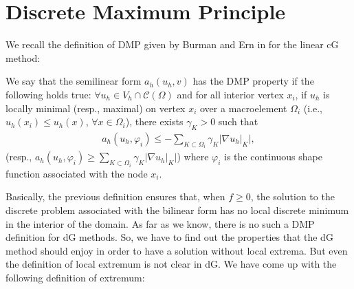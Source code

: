  
\section{Discrete Maximum Principle}\label{s-dmp}
 We recall the definition of DMP given by Burman and Ern in \cite{burman_discrete_2004,burman_nonlinear_2007} for the linear cG method:
 
 \begin{definition}[DMP cG]
 We say that the semilinear form $a_h(u_h,v)$ has the DMP property if the following holds true: $\forall u_h\in V_h\cap \mathcal{C}(\Omega)$ and for all interior vertex $x_i$, if $u_h$ is locally minimal (resp., maximal) on vertex $x_i$ over a macroelement $\Omega_i$ (i.e., $u_h(x_i)\leq u_h(x)$,  $\forall x\in\Omega_i$), there exists $\gamma_K>0$ such that
  \begin{align*}
 a_h(u_h,\varphi_i)\leq - \sum_{K\subset\Omega_i} \gamma_K |\nabla u_h|_K|,
 \end{align*} 
 (resp., $a_h(u_h,\varphi_i)\geq  \sum_{K\subset\Omega_i} \gamma_K |\nabla u_h|_K|$) where $\varphi_i$ is the continuous shape function associated with the node $x_i$.
  \end{definition}
Basically, the previous definition ensures that, when $f\geq 0$, the solution to the discrete problem associated with the bilinear form has no local discrete minimum in the interior of the domain. As far as we know, there is no such a DMP definition for dG methods. So, we have to find out the properties that the dG method should enjoy in order to have a solution without local extrema. But even the definition of local extremum is not clear in dG. { We have come up with the following definition of extremum}:%
